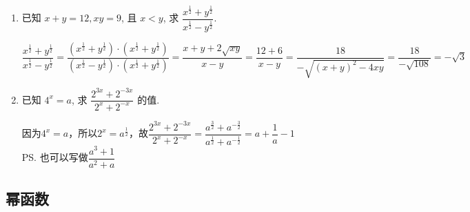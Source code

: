 \begin{enumerate}
\begin{jieda}
(2) $x^2$; 

(3) $-9a$. 
\end{jieda}


\item 已知 $x+y=12, x y=9$, 且 $x<y$, 求 $\dfrac{x^{\frac{1}{2}}+y^{\frac{1}{2}}}{x^{\frac{1}{2}}-y^{\frac{1}{2}}}$.
\begin{jieda}
    $\dfrac{x^{\frac{1}{2}}+y^{\frac{1}{2}}}{x^{\frac{1}{2}}-y^{\frac{1}{2}}} = \dfrac{\left ( x^{\frac{1}{2}}+y^{\frac{1}{2}} \right) \cdot \left ( x^{\frac{1}{2}}+y^{\frac{1}{2}} \right)}{\left ( x^{\frac{1}{2}}-y^{\frac{1}{2}} \right) \cdot \left ( x^{\frac{1}{2}}+y^{\frac{1}{2}} \right)} = \dfrac{x+y+2\sqrt{xy}}{x-y} = \dfrac{12 + 6}{x-y} = \dfrac{18}{-\sqrt{(x+y)^2-4xy}} = \dfrac{18}{-\sqrt{108}} = -\sqrt{3}$
\end{jieda}
\begin{vspace_}
\vsp[2]
\end{vspace_}

\item 已知 $4^x=a$, 求 $\dfrac{2^{3 x}+2^{-3 x}}{2^x+2^{-x}}$ 的值.
\begin{jieda}
    因为$4^x=a$，所以$2^x = a^{\frac{1}{2}}$，故$\dfrac{2^{3 x}+2^{-3 x}}{2^x+2^{-x}} = \dfrac{a^{\frac{3}{2}} + a^{-\frac{3}{2}}}{a^{\frac{1}{2}} + a^{-\frac{1}{2}}} = a + \dfrac{1}{a} - 1$ \\
    \ps 也可以写做$\dfrac{a^3+1}{a^2+a}$
\end{jieda}
\begin{vspace_}
\vsp[2]
\end{vspace_}

\end{enumerate}

\subsection*{幂函数}

